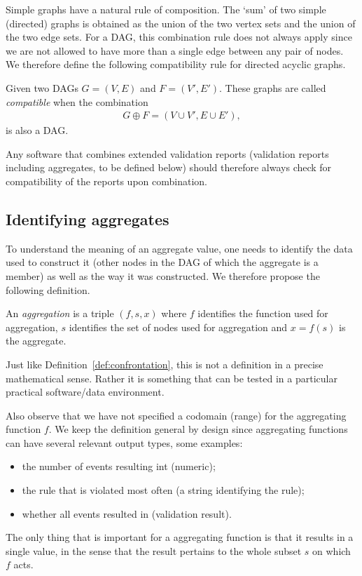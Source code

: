 Simple graphs have a natural rule of composition. The `sum' of two simple
(directed) graphs is obtained as the union of the two vertex sets and the union
of the two edge sets. For a DAG, this combination rule does not always apply
since we are not allowed to have more than a single edge between any pair of
nodes.  We therefore define the following compatibility rule for directed acyclic
graphs.
\begin{definition}
\label{def:compatibledag}
Given two DAGs $G=(V,E)$ and $F=(V',E')$. These graphs are called
\emph{compatible} when the combination
\begin{align*}
G\oplus F = (V\cup V', E\cup E'),
\end{align*}
is also a DAG.
\end{definition}
Any software that combines extended validation reports (validation reports
including aggregates, to be defined below) should therefore always check for
compatibility of the reports upon combination.

\subsection{Identifying aggregates}
To understand the meaning of an aggregate value, one needs to identify the data
used to construct it (other nodes in the DAG of which the aggregate is a
member) as well as the way it was constructed. We therefore propose the
following definition.

\begin{definition}[aggregation]
\label{def:aggregation}
An \emph{aggregation} is a triple $(f,s,x)$ where $f$ identifies the function
used for aggregation, $s$ identifies the set of nodes used for aggregation and
$x=f(s)$ is the aggregate.
\end{definition}
Just like Definition~\ref{def:confrontation}, this is not a definition in a
precise mathematical sense. Rather it is something that can be tested in a
particular practical software/data environment. 

Also observe that we have not specified a codomain (range) for the aggregating
function $f$. We keep the definition general by design since aggregating
functions can have several relevant output types, some examples:
\begin{itemize}
\item the number of events resulting int \waar{} (numeric);
\item the rule that is violated most often (a string identifying the rule);
\item whether all events resulted in \waar{} (validation result).
\end{itemize}
The only thing that is important for a aggregating function is that it results
in a single value, in the sense that the result pertains to the whole subset
$s$ on which $f$ acts.


